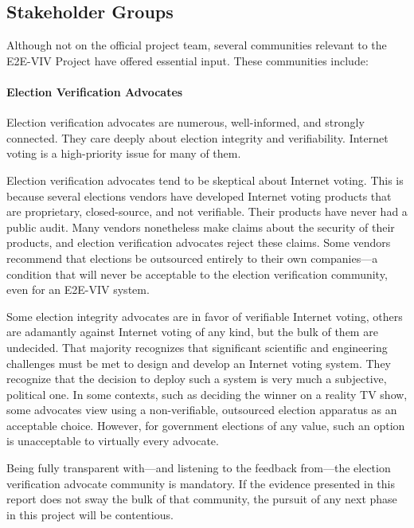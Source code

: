 \subsection{Stakeholder Groups}
\label{sec:stakeholder-groups}

Although not on the official project team, several communities
relevant to the E2E-VIV Project have offered essential input. These
communities include:

\paragraph{Election Verification Advocates}
Election verification advocates are numerous, well-informed, and
strongly connected. They care deeply about election integrity and
verifiability. Internet voting is a high-priority issue for many of
them.

Election verification advocates tend to be skeptical about Internet
voting. This is because several elections vendors have developed
Internet voting products that are proprietary, closed-source, and not
verifiable. Their products have never had a public audit. Many vendors
nonetheless make claims about the security of their products, and
election verification advocates reject these claims. Some vendors
recommend that elections be outsourced entirely to their own
companies---a condition that will never be acceptable to the election
verification community, even for an E2E-VIV system.

Some election integrity advocates are in favor of verifiable Internet
voting, others are adamantly against Internet voting of any kind, but
the bulk of them are undecided. That majority recognizes that
significant scientific and engineering challenges must be met to
design and develop an Internet voting system. They recognize that the
decision to deploy such a system is very much a subjective, political
one. In some contexts, such as deciding the winner on a reality TV
show, some advocates view using a non-verifiable, outsourced election
apparatus as an acceptable choice. However, for government elections
of any value, such an option is unacceptable to virtually every
advocate.

Being fully transparent with---and listening to the feedback
from---the election verification advocate community is mandatory. If
the evidence presented in this report does not sway the bulk of that
community, the pursuit of any next phase in this project will be
contentious.

